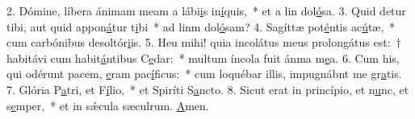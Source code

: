 2. Dómine, líbera ánimam meam a lábi\uline{i}s in\uline{í}quis,~* et a lin dol\uline{ó}sa.
3. Quid detur tibi, aut quid appon\uline{á}tur t\uline{i}bi~* ad linm dol\uline{ó}sam?
4. Sagíttæ pot\uline{é}ntis ac\uline{ú}tæ,~* cum carbónibus desoltór\uline{i}is.
5. Heu mihi! quia incolátus meus prolongátus est:~† habitávi cum habit\uline{á}ntibus C\uline{e}dar:~* multum íncola fuit ánma m\uline{e}a.
6. Cum his, qui odérunt pacem, \uline{e}ram pac\uline{í}ficus:~* cum loquébar illis, impugnábnt me gr\uline{a}tis.
7. Glória P\uline{a}tri, et F\uline{í}lio,~* et Spiríti S\uline{a}ncto.
8. Sicut erat in princípio, et n\uline{u}nc, et s\uline{e}mper,~* et in sǽcula sæculrum. \uline{A}men.
